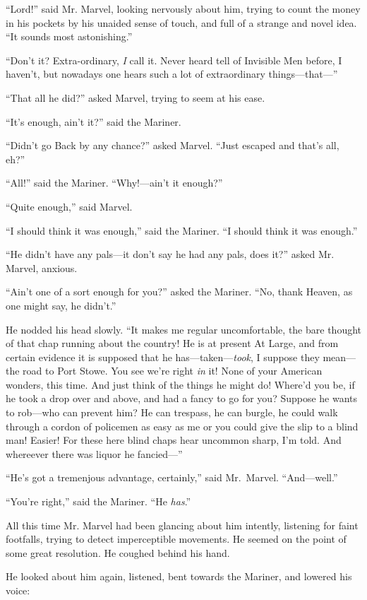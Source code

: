 “Lord!” said Mr. Marvel, looking nervously about him, trying to count the money in his pockets by his unaided sense of touch, and full of a strange and novel idea. “It sounds most astonishing.”

“Don’t it? Extra-ordinary, \emph{I} call it. Never heard tell of Invisible Men before, I haven’t, but nowadays one hears such a lot of extraordinary things—that—”

“That all he did?” asked Marvel, trying to seem at his ease.

“It’s enough, ain’t it?” said the Mariner.

“Didn’t go Back by any chance?” asked Marvel. “Just escaped and that’s all, eh?”

“All!” said the Mariner. “Why!—ain’t it enough?”

“Quite enough,” said Marvel.

“I should think it was enough,” said the Mariner. “I should think it was enough.”

“He didn’t have any pals—it don’t say he had any pals, does it?” asked Mr. Marvel, anxious.

“Ain’t one of a sort enough for you?” asked the Mariner. “No, thank Heaven, as one might say, he didn’t.”

He nodded his head slowly. “It makes me regular uncomfortable, the bare thought of that chap running about the country! He is at present At Large, and from certain evidence it is supposed that he has—taken—\emph{took}, I suppose they mean—the road to Port Stowe. You see we’re right \emph{in} it! None of your American wonders, this time. And just think of the things he might do! Where’d you be, if he took a drop over and above, and had a fancy to go for you? Suppose he wants to rob—who can prevent him? He can trespass, he can burgle, he could walk through a cordon of policemen as easy as me or you could give the slip to a blind man! Easier! For these here blind chaps hear uncommon sharp, I’m told. And whereever there was liquor he fancied—”

“He’s got a tremenjous advantage, certainly,” said Mr.\ Marvel. “And—well.”

“You’re right,” said the Mariner. “He \emph{has}.”

All this time Mr. Marvel had been glancing about him intently, listening for faint footfalls, trying to detect imperceptible movements. He seemed on the point of some great resolution. He coughed behind his hand.

He looked about him again, listened, bent towards the Mariner, and lowered his voice:

